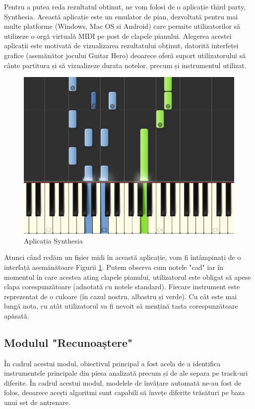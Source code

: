\documentclass[a4paper,12pt]{report}
\begin{document}
	Pentru a putea reda rezultatul obtinut, ne vom folosi de o aplicație third party, Synthesia. Această aplicație este un emulator de pian, dezvoltată pentru mai multe platforme (Windows, Mac OS si Android) care permite utilizatorilor să utilizeze o orgă virtuală MIDI pe post de clapele pianului. Alegerea acestei aplicații este motivată de vizualizarea rezultatului obținut, datorită interfeței grafice (asemănător jocului Guitar Hero) deoarece oferă suport utilizatorului să cânte partitura și să vizualizeze durata notelor, precum și instrumentul utilizat.   
	
	\begin{figure}[H]
		\begin{center}
			\includegraphics[scale=0.4]{images/synhesia.PNG}
		\end{center}
		\caption{Aplicația Synthesia}
		\label{fig:synthesia}
	\end{figure}

	Atunci când redăm un fișier midi în această aplicație, vom fi întâmpinați de o interfață asemănătoare Figurii \ref{fig:synthesia}. Putem observa cum notele "cad" iar în momentul în care acestea ating clapele pianului, utilizatorul este obligat să apese clapa corespunzătoare (adnotată cu notele standard). Fiecare instrument este reprezentat de o culoare (în cazul nostru, albastru și verde). Cu cât este mai lungă nota, cu atât utilizatorul va fi nevoit să mențină tasta corespunzătoare apăsată.
	
   \clearpage
   \subsection{Modulul "Recunoaștere"}
   În cadrul acestui modul, obiectivul principal a fost acela de a identifica instrumentele principale din piesa analizată precum și de ale separa pe track-uri diferite. În cadrul acestui modul, modelele de învățare automată ne-au fost de folos, deoarece acești algoritmi sunt capabili să învețe diferite trăsături pe baza unui set de antrenare. 
   
\end{document}
